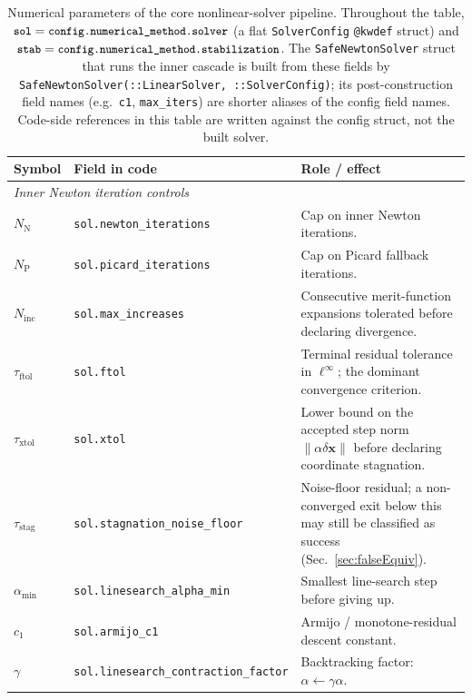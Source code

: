 \documentclass{article}
\newcommand{\code}[1]{\texttt{\small #1}}
\newcommand{\textftol}{\tau_{\mathrm{ftol}}}
\newcommand{\textstag}{\tau_{\mathrm{stag}}}
\newcommand{\textxtol}{\tau_{\mathrm{xtol}}}
\begin{document}
\begin{table}[h]
\centering
\caption{Numerical parameters of the core nonlinear-solver pipeline.
Throughout the table, $\code{sol} = \code{config.numerical\_method.solver}$
(a flat \code{SolverConfig} \code{@kwdef} struct) and
$\code{stab} = \code{config.numerical\_method.stabilization}$. The
\code{SafeNewtonSolver} struct that runs the inner cascade is built from
these fields by \code{SafeNewtonSolver(::LinearSolver, ::SolverConfig)};
its post-construction field names (e.g.\ \code{c1}, \code{max\_iters})
are shorter aliases of the config field names. Code-side references in
this table are written against the config struct, not the built solver.}
\label{tab:params}
\footnotesize
\begin{tabularx}{\textwidth}{@{} l l X @{}}
\toprule
\textbf{Symbol} & \textbf{Field in code} & \textbf{Role / effect} \\
\midrule
\multicolumn{3}{l}{\emph{Inner Newton iteration controls}} \\
$N_{\mathrm{N}}$         & \code{sol.newton\_iterations}           & Cap on inner Newton iterations. \\
$N_{\mathrm{P}}$         & \code{sol.picard\_iterations}           & Cap on Picard fallback iterations. \\
$N_{\mathrm{inc}}$       & \code{sol.max\_increases}               & Consecutive merit-function expansions tolerated before declaring divergence. \\
$\textftol$              & \code{sol.ftol}                          & Terminal residual tolerance in $\ell^\infty$; the dominant convergence criterion. \\
$\textxtol$              & \code{sol.xtol}                          & Lower bound on the accepted step norm $\|\alpha\delta\boldsymbol{x}\|$ before declaring coordinate stagnation. \\
$\textstag$              & \code{sol.stagnation\_noise\_floor}      & Noise-floor residual; a non-converged exit below this may still be classified as success (Sec.~\ref{sec:falseEquiv}). \\
$\alpha_{\min}$          & \code{sol.linesearch\_alpha\_min}        & Smallest line-search step before giving up. \\
$c_1$                    & \code{sol.armijo\_c1}                    & Armijo / monotone-residual descent constant. \\
$\gamma$                 & \code{sol.linesearch\_contraction\_factor} & Backtracking factor: $\alpha \leftarrow \gamma\alpha$. \\

\end{tabularx}
\end{table}
\end{document}
